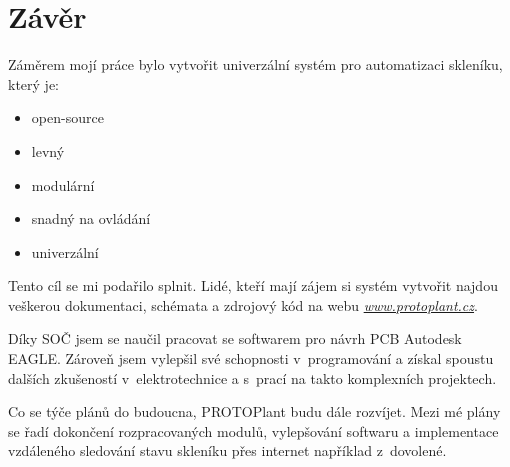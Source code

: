 \chapter*{Závěr}

Záměrem mojí práce bylo vytvořit univerzální systém pro automatizaci skle\-ní\-ku, který je:
\begin{itemize}
    \item open-source
    \item levný
    \item modulární
    \item snadný na ovládání
    \item univerzální
\end{itemize}

Tento cíl se mi podařilo splnit.
Lidé, kteří mají zájem si systém vytvořit najdou veškerou dokumentaci, schémata a zdrojový kód na webu \textit{\url{www.protoplant.cz}}.

Díky SOČ jsem se naučil pracovat se softwarem pro návrh PCB Autodesk EAGLE.
Zároveň jsem vylepšil své schopnosti v~programování a získal spoustu dalších zkušeností v~elektrotechnice a s~prací na takto komplexních projektech.

Co se týče plánů do budoucna, PROTOPlant budu dále rozvíjet.
Mezi mé plány se řadí dokončení rozpracovaných modulů, vylepšování softwaru a implementace vzdáleného sledování stavu skleníku přes internet například z~dovolené.

\newpage